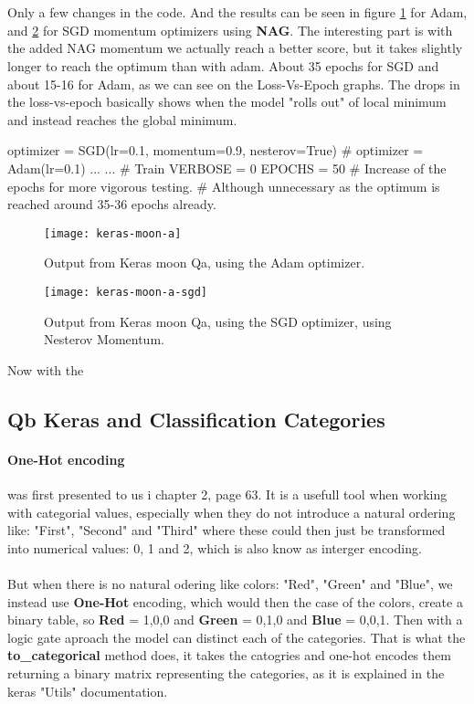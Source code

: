 \documentclass{article}
\begin{document}
\\ \\
\noindent
Only a few changes in the code. And the results can be seen in figure \ref{fig:keras-moon-a} for Adam, and \ref{fig:keras-moon-a-sgd} for SGD momentum optimizers using \textbf{NAG}. The interesting part is with the added NAG momentum we actually reach a better score, but it takes slightly longer to reach the optimum than with adam.
About 35 epochs for SGD and about 15-16 for Adam, as we can see on the Loss-Vs-Epoch graphs. The drops in the loss-vs-epoch basically shows when the model "rolls out" of local minimum and instead reaches the global minimum.
\begin{pyminted}
optimizer = SGD(lr=0.1, momentum=0.9, nesterov=True)
# optimizer = Adam(lr=0.1)
...
...
# Train
VERBOSE     = 0
EPOCHS      = 50 # Increase of the epochs for more vigorous testing.
# Although unnecessary as the optimum is reached around 35-36 epochs already.
\end{pyminted}

\begin{figure}[H]
  \centering
    \texttt{[image: keras-moon-a]}
    \caption{Output from Keras moon Qa, using the Adam optimizer.}
    \label{fig:keras-moon-a}
\end{figure}
\begin{figure}[H]
  \centering
    \texttt{[image: keras-moon-a-sgd]}
    \caption{Output from Keras moon Qa, using the SGD optimizer, using Nesterov Momentum.}
    \label{fig:keras-moon-a-sgd}
\end{figure}

\noindent
Now with the 

\subsection{Qb Keras and Classification Categories}
\paragraph{One-Hot encoding} was first presented to us i chapter 2, page 63. It is a usefull tool when working with categorial values, especially when they do not introduce a natural ordering like: "First", "Second" and "Third" where these could then just be transformed into numerical values: 0, 1 and 2, which is also know as interger encoding. 
\\ \\
But when there is no natural odering like colors: "Red", "Green" and "Blue", we instead use \textbf{One-Hot} encoding, which would then the case of the colors, create a binary table, so \textbf{Red} = 1,0,0 and \textbf{Green} = 0,1,0 and \textbf{Blue} = 0,0,1.
Then with a logic gate aproach the model can distinct each of the categories. That is what the \textbf{to\_categorical} method does, it takes the catogries and one-hot encodes them returning a binary matrix representing the categories, as it is explained in the keras "Utils" documentation.
\end{document}
